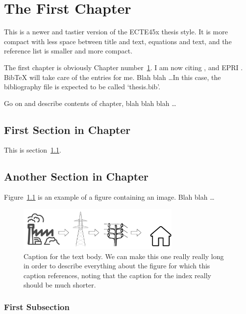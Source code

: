 \chapter{The First Chapter}\label{chap:first}

This is a newer and tastier version of the ECTE45x thesis style. It is more
compact with less space between title and text, equations and text, and the
reference list is smaller and more compact. 

The first chapter is obviously Chapter number~\ref{chap:first}. I am now
citing \citet{RN6}, \citet{RN6} and EPRI \citep{RN6}.
BibTeX will take care of the entries for me.  Blah blah \ldots In this case,
the bibliography file is expected to be called `thesis.bib'.

Go on and describe contents of chapter, blah blah blah \ldots

\section{First Section in Chapter}\label{first:sec}

This is section~\ref{first:sec}.

\section{Another Section in Chapter}

Figure~\ref{fig:example} is an example of a figure containing an image.
Blah blah \ldots

\begin{figure}[!h]
\begin{singlespace}
\centering
\includegraphics[width=8cm]{ElectricalGrid.png}
\caption[Caption for the List of Figures.]{Caption for the text body. We can
make this one really really long in order to describe everything
about the figure for which this caption references, noting that
the caption for the index really should be much shorter.}
\label{fig:example}
\end{singlespace}
\end{figure}

\subsection{First Subsection}

